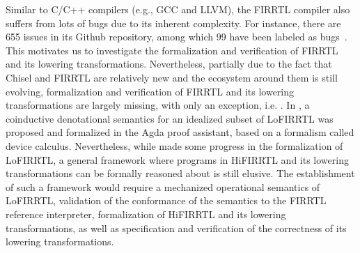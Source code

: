 Similar to C/C++ compilers (e.g., GCC and LLVM),
the FIRRTL compiler also suffers from lots of bugs due to its inherent complexity. For instance, there are 655 issues in its Github repository, among which
99 have been labeled as bugs~\cite{FIRRTLissues}. This motivates us to investigate the formalization and verification of FIRRTL and its lowering transformations.
%
%
Nevertheless, partially due to the fact that Chisel and FIRRTL are relatively new and the ecosystem around them is still evolving, formalization and verification of FIRRTL and its lowering transformations are largely missing, with only an exception, i.e. \cite{HarrisonHA21}. 
In \cite{HarrisonHA21}, a coinductive denotational semantics for an idealized subset of LoFIRRTL was proposed and formalized in the Agda proof assistant, based on a formalism called device calculus. Nevertheless, while \cite{HarrisonHA21} made some progress in the formalization of LoFIRRTL, a general framework where programs in HiFIRRTL and its lowering transformations can be formally reasoned about is still elusive. The establishment of such a framework would require
a mechanized operational semantics of LoFIRRTL,
%
validation of the conformance of the semantics to the FIRRTL reference interpreter,
%
formalization of HiFIRRTL and its lowering transformations,
%
as well as specification and verification of the correctness of its lowering transformations.

